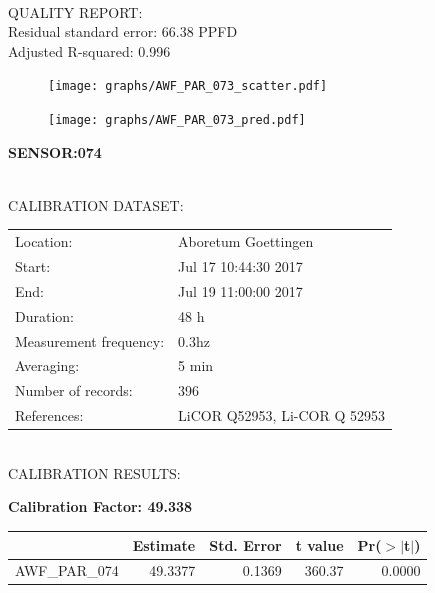 \documentclass[oneside]{report}
\begin{document}
\hrulefill\\
QUALITY REPORT:\\
Residual standard error: 66.38 PPFD\\
Adjusted R-squared: 0.996



\begin{figure}[H]
  \centering
  \texttt{[image: graphs/AWF\_PAR\_073\_scatter.pdf]}
\end{figure}




\begin{figure}[H]
  \centering
  \texttt{[image: graphs/AWF\_PAR\_073\_pred.pdf]}
\end{figure}

\pagebreak


\begin{center}
\large{\textbf{SENSOR:074}}\\
\end{center}

\hrulefill\\
CALIBRATION DATASET:\\
\begin{table}[h!]
  \centering
  \label{tab:table1}
  \begin{tabular}{ll}
    Location: & Aboretum Goettingen\\ 
    
    
    Start:  & Jul 17 10:44:30 2017 \\
    End:   & Jul 19 11:00:00 2017\\ 
    Duration: & 48 h\\
    Measurement frequency: & 0.3hz\\
    Averaging:  &5 min\\
    Number of records: & 396 \\
    References: & LiCOR Q52953, Li-COR Q 52953 \\
  \end{tabular}
\end{table}

\hrulefill\\
CALIBRATION RESULTS:\\


\begin{center}
\textbf{\large{Calibration Factor: 49.338}}\\
\end{center}
\begin{table}[ht]
\centering
\begin{tabular}{rrrrr}
  \hline
 & Estimate & Std. Error & t value & Pr($>$$|$t$|$) \\ 
  \hline
AWF\_PAR\_074 & 49.3377 & 0.1369 & 360.37 & 0.0000 \\ 
   \hline
\end{tabular}
\end{table}
\end{document}
